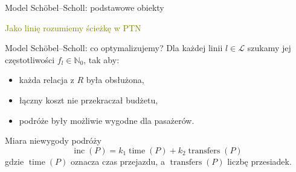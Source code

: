 \documentclass[ignorenonframetext]{beamer}
\DeclareMathOperator{\Time}{time}
\DeclareMathOperator{\Inc}{inc}
\DeclareMathOperator{\Trans}{transfers}
\begin{document}
\begin{frame}{Model Schöbel--Scholl: podstawowe obiekty}
{ 
  }
\end{frame}

\textcolor{olive} { Jako linię rozumiemy ścieżkę w PTN }

\begin{frame}{Model Schöbel--Scholl: co optymalizujemy?}
  Dla każdej linii \(l \in \mathcal{L}\) szukamy jej częstotliwości \(f_l \in \mathbb{N}_{0}\), tak aby:
  \begin{itemize}
  \item każda relacja z \(R\) była obsłużona,
  \item łączny koszt nie przekraczał budżetu,
  \item podróże były możliwie wygodne dla pasażerów.
  \end{itemize}
  \begin{block}{Miara niewygody podróży}
    \[
      \Inc(P) = k_1\Time(P) + k_2\Trans(P)
    \]
    gdzie \(\Time(P)\) oznacza czas przejazdu, a \(\Trans(P)\) liczbę przesiadek.
  \end{block}
\end{frame}
\end{document}
